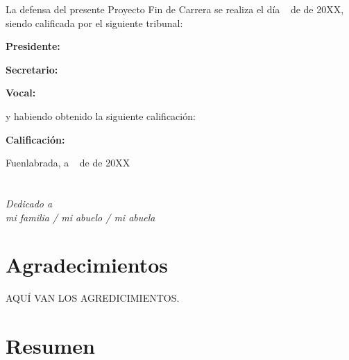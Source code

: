 \documentclass[a4paper, 12pt]{book}
\begin{document}
\vspace{1cm}
La defensa del presente Proyecto Fin de Carrera se realiza el d\'ia \qquad$\;\,$ de \qquad\qquad\qquad\qquad \newline de 20XX, siendo calificada por el siguiente tribunal:


\vspace{0.5cm}
\textbf{Presidente:}

\vspace{1.2cm}
\textbf{Secretario:}

\vspace{1.2cm}
\textbf{Vocal:}


\vspace{1.2cm}
y habiendo obtenido la siguiente calificaci\'on:

\vspace{1cm}
\textbf{Calificaci\'on:}


\vspace{1cm}
\begin{flushright}
Fuenlabrada, a \qquad$\;\,$ de \qquad\qquad\qquad\qquad de 20XX
\end{flushright}


\chapter*{}
\begin{flushright}
\textit{Dedicado a \\
mi familia / mi abuelo / mi abuela}
\end{flushright}


\chapter*{Agradecimientos}

{{AQU\'I VAN LOS AGREDICIMIENTOS}}.


\chapter*{Resumen}
\end{document}

